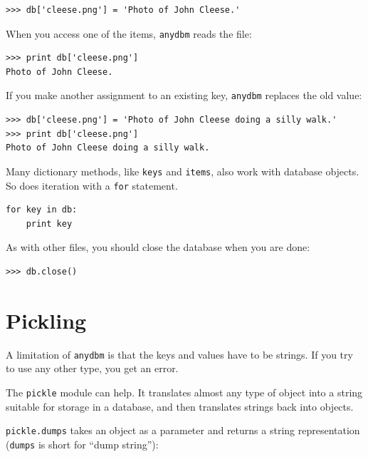 \documentclass[10pt]{book}
\begin{document}
{


\beforeverb
\begin{verbatim}
>>> db['cleese.png'] = 'Photo of John Cleese.'
\end{verbatim}
\afterverb
%
When you access one of the items, {\tt anydbm} reads the file:

\beforeverb
\begin{verbatim}
>>> print db['cleese.png']
Photo of John Cleese.
\end{verbatim}
\afterverb
%
If you make another assignment to an existing key, {\tt anydbm} replaces
the old value:

\beforeverb
\begin{verbatim}
>>> db['cleese.png'] = 'Photo of John Cleese doing a silly walk.'
>>> print db['cleese.png']
Photo of John Cleese doing a silly walk.
\end{verbatim}
\afterverb
%
Many dictionary methods, like {\tt keys} and {\tt items}, also
work with database objects.  So does iteration with a {\tt for}
statement.


\beforeverb
\begin{verbatim}
for key in db:
    print key
\end{verbatim}
\afterverb
%
As with other files, you should close the database when you are
done:

\beforeverb
\begin{verbatim}
>>> db.close()
\end{verbatim}
\afterverb
%



\section{Pickling}


A limitation of {\tt anydbm} is that the keys and values have
to be strings.  If you try to use any other type, you get an
error.


The {\tt pickle} module can help.  It translates
almost any type of object into a string suitable for storage in a
database, and then translates strings back into objects.

{\tt pickle.dumps} takes an object as a parameter and returns
a string representation ({\tt dumps} is short for ``dump string''):

}
\end{document}
